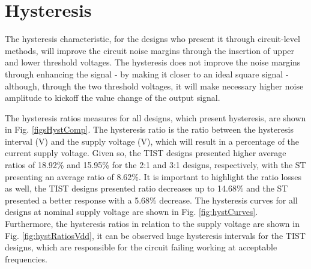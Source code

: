 \documentclass[diss,pgmicro,english]{iiufrgs}
\begin{document}
\section{Hysteresis}

The hysteresis characteristic, for the designs who present it through circuit-level methods, will improve the circuit noise margins through the insertion of upper and lower threshold voltages. The hysteresis does not improve the noise margins through enhancing the signal - by making it closer to an ideal square signal - although, through the two threshold voltages, it will make necessary higher noise amplitude to kickoff the value change of the output signal.

    The hysteresis ratios measures for all designs, which present hysteresis, are shown in Fig. \ref{figsHystComp}. The hysteresis ratio is the ratio between the hysteresis interval (V) and the supply voltage (V), which will result in a percentage of the current supply voltage. Given so, the TIST designs presented higher average ratios of 18.92\% and 15.95\% for the 2:1 and 3:1 designs, respectively, with the ST presenting an average ratio of 8.62\%. It is important to highlight the ratio losses as well, the TIST designs presented ratio decreases up to 14.68\% and the ST presented a better response with a 5.68\% decrease. The hysteresis curves for all designs at nominal supply voltage are shown in Fig. \ref{fig:hystCurves}. Furthermore, the hysteresis ratios in relation to the supply voltage are shown in Fig. \ref{fig:hystRatiosVdd}, it can be observed huge hysteresis intervals for the TIST designs, which are responsible for the circuit failing working at acceptable frequencies.


\end{document}
